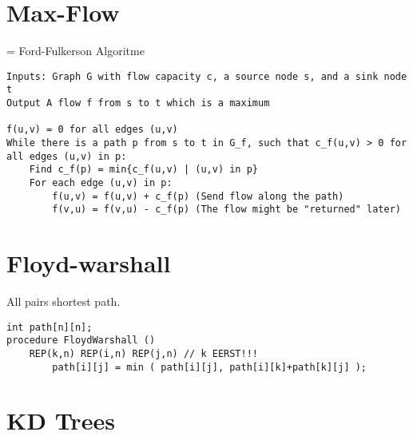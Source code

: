 \documentclass[a4paper,10pt,oneside]{report}
\begin{document}
\section{Max-Flow}
= Ford-Fulkerson Algoritme
\begin{verbatim}
Inputs: Graph G with flow capacity c, a source node s, and a sink node t
Output A flow f from s to t which is a maximum

f(u,v) = 0 for all edges (u,v)
While there is a path p from s to t in G_f, such that c_f(u,v) > 0 for all edges (u,v) in p:
    Find c_f(p) = min{c_f(u,v) | (u,v) in p}
    For each edge (u,v) in p:
        f(u,v) = f(u,v) + c_f(p) (Send flow along the path)
        f(v,u) = f(v,u) - c_f(p) (The flow might be "returned" later)
\end{verbatim}

\section{Floyd-warshall}
All pairs shortest path.
\begin{verbatim}
int path[n][n];
procedure FloydWarshall ()
    REP(k,n) REP(i,n) REP(j,n) // k EERST!!!
	    path[i][j] = min ( path[i][j], path[i][k]+path[k][j] );
\end{verbatim}
\section{KD Trees}
\end{document}
